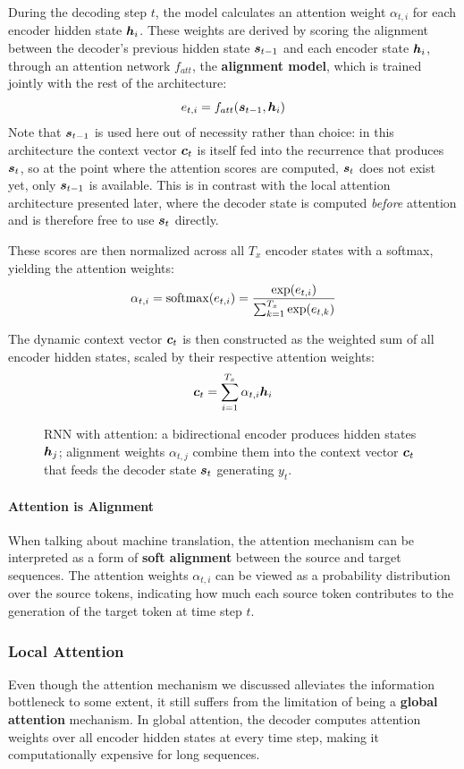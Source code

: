 During the decoding step $t$, the model calculates an attention weight $\alpha_{t,i}$ for each encoder hidden state $\boldsymbol{h}_i$.
These weights are derived by scoring the alignment between the decoder's previous hidden state $\boldsymbol{s}_{t-1}$ and each encoder state $\boldsymbol{h}_i$, through an attention network $f_{att}$, the \textbf{alignment model}, which is trained jointly with the rest of the architecture:
\[
e_{t,i} = f_{att}(\boldsymbol{s}_{t-1}, \boldsymbol{h}_i)
\]
Note that $\boldsymbol{s}_{t-1}$ is used here out of necessity rather than choice: in this architecture the context vector $\boldsymbol{c}_t$ is itself fed into the recurrence that produces $\boldsymbol{s}_t$, so at the point where the attention scores are computed, $\boldsymbol{s}_t$ does not exist yet, only $\boldsymbol{s}_{t-1}$ is available. This is in contrast with the local attention architecture presented later, where the decoder state is computed \textit{before} attention and is therefore free to use $\boldsymbol{s}_t$ directly.

These scores are then normalized across all $T_x$ encoder states with a softmax, yielding the attention weights:
\[
\alpha_{t,i} = \operatorname{softmax}(e_{t,i}) = \frac{\exp(e_{t,i})}{\sum_{k=1}^{T_x} \exp(e_{t,k})}
\]

The dynamic context vector $\boldsymbol{c}_t$ is then constructed as the weighted sum of all encoder hidden states, scaled by their respective attention weights:
\[
\boldsymbol{c}_t = \sum_{i=1}^{T_x} \alpha_{t,i} \boldsymbol{h}_i
\]

\begin{figure}[H]
    \centering
    
    \caption{RNN with attention: a bidirectional encoder produces hidden states $\boldsymbol{h}_j$; alignment weights $\alpha_{t,j}$ combine them into the context vector $\boldsymbol{c}_t$ that feeds the decoder state $\boldsymbol{s}_t$ generating $y_t$.}
\end{figure}

\paragraph{Attention is Alignment}
When talking about machine translation, the attention mechanism can be interpreted as a form of \textbf{soft alignment} between the source and target sequences.
The attention weights $\alpha_{t,i}$ can be viewed as a probability distribution over the source tokens, indicating how much each source token contributes to the generation of the target token at time step $t$.

\subsubsection{Local Attention}
Even though the attention mechanism we discussed alleviates the information bottleneck to some extent, it still suffers from the limitation of being a \textbf{global attention} mechanism.
In global attention, the decoder computes attention weights over all encoder hidden states at every time step, making it computationally expensive for long sequences.

